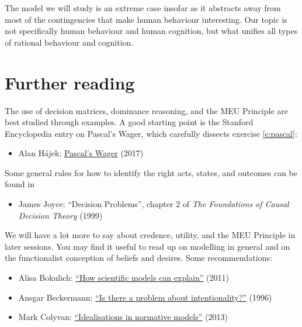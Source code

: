 The model we will study is an extreme case insofar as it abstracts
away from most of the contingencies that make human behaviour
interesting. Our topic is not specifically human behaviour and human
cognition, but what unifies all types of rational behaviour and
cognition.

\section{Further reading}

The use of decision matrices, dominance reasoning, and the MEU
Principle are best studied through examples. A good starting point is
the Stanford Encyclopedia entry on Pascal's Wager, which carefully
dissects exercise \ref{e:pascal}:

\begin{itemize}
\item Alan H\'ajek: \href{http://plato.stanford.edu/entries/pascal-wager/}{Pascal's Wager} (2017)
\end{itemize}

Some general rules for how to identify the right acts, states, and
outcomes can be found in

\begin{itemize}
\item James Joyce: ``Decision Problems'', chapter 2 of \emph{The
    Foundations of Causal Decision Theory} (1999)
\end{itemize}

We will have a lot more to say about credence, utility, and the MEU
Principle in later sessions. You may find it useful to read up on
modelling in general and on the functionalist conception of beliefs
and desires. Some recommendations:

\begin{itemize}
  \itemsep0em 

\item Alisa Bokulich: \href{http://www.romanfrigg.org/Links/MS2/Bokulich.pdf}{``How scientific models can explain''} (2011)

\item Ansgar Beckermann:
  \href{https://www.uni-bielefeld.de/(en)/philosophie/personen/beckermann/pbint_ve.pdf}{``Is
    there a problem about intentionality?''} (1996)

\item Mark Colyvan: \href{http://www.colyvan.com/papers/iinm.pdf}{``Idealisations in normative models''} (2013)

  
\end{itemize}

